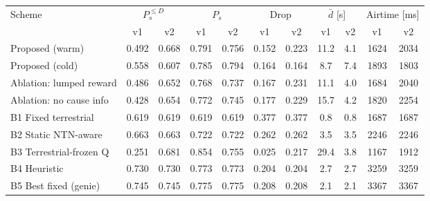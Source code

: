 \begin{tabular}{lcccccccccc}
\toprule
Scheme & \multicolumn{2}{c}{$P_s^{\le D}$} & \multicolumn{2}{c}{$P_s$} & \multicolumn{2}{c}{Drop} & \multicolumn{2}{c}{$\bar d$ [s]} & \multicolumn{2}{c}{Airtime [ms]} \\
 & v1 & v2 & v1 & v2 & v1 & v2 & v1 & v2 & v1 & v2 \\
\midrule
Proposed (warm) & 0.492 & 0.668 & 0.791 & 0.756 & 0.152 & 0.223 & 11.2 & 4.1 & 1624 & 2034 \\
Proposed (cold) & 0.558 & 0.607 & 0.785 & 0.794 & 0.164 & 0.164 & 8.7 & 7.4 & 1893 & 1803 \\
Ablation: lumped reward & 0.486 & 0.652 & 0.768 & 0.737 & 0.167 & 0.231 & 11.1 & 4.0 & 1684 & 2040 \\
Ablation: no cause info & 0.428 & 0.654 & 0.772 & 0.745 & 0.177 & 0.229 & 15.7 & 4.2 & 1820 & 2254 \\
B1 Fixed terrestrial & 0.619 & 0.619 & 0.619 & 0.619 & 0.377 & 0.377 & 0.8 & 0.8 & 1687 & 1687 \\
B2 Static NTN-aware & 0.663 & 0.663 & 0.722 & 0.722 & 0.262 & 0.262 & 3.5 & 3.5 & 2246 & 2246 \\
B3 Terrestrial-frozen Q & 0.251 & 0.681 & 0.854 & 0.755 & 0.025 & 0.217 & 29.4 & 3.8 & 1167 & 1912 \\
B4 Heuristic & 0.730 & 0.730 & 0.773 & 0.773 & 0.204 & 0.204 & 2.7 & 2.7 & 3259 & 3259 \\
B5 Best fixed (genie) & 0.745 & 0.745 & 0.775 & 0.775 & 0.208 & 0.208 & 2.1 & 2.1 & 3367 & 3367 \\
\bottomrule
\end{tabular}